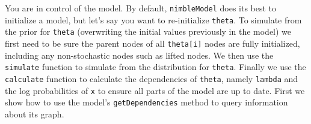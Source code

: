 \documentclass[12pt,oneside]{book}\usepackage[]{graphicx}\usepackage[]{color}
\def\cd#1{\texttt{#1}}
\begin{document}
You are in control of the model.  By default, \cd{nimbleModel} does
its best to initialize a model, but let's say you want to
re-initialize \cd{theta}.  To simulate from the prior for \cd{theta} (overwriting the
initial values previously in the model) we first need to be sure the
parent nodes of all \cd{theta[i]} nodes are fully initialized, including any non-stochastic nodes such
as lifted nodes.  We then use the \cd{simulate} function to simulate
from the distribution for \cd{theta}.  Finally we use the
\cd{calculate} function to 
calculate the dependencies of \cd{theta}, namely \cd{lambda} and the
log probabilities of \cd{x} to ensure all parts of the
model are up to date.  First we show how
to use the model's \cd{getDependencies} method to query information
about its graph.

\end{document}
